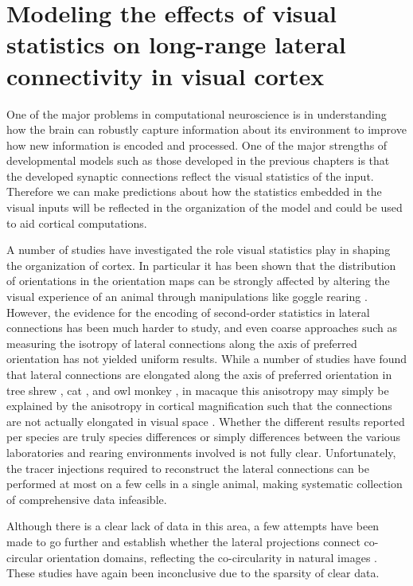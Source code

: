 \chapter{Modeling the effects of visual statistics on long-range lateral connectivity in visual cortex}

One of the major problems in computational neuroscience is in
understanding how the brain can robustly capture information about its
environment to improve how new information is encoded and
processed. One of the major strengths of developmental models such
as those developed in the previous chapters is that the developed
synaptic connections reflect the visual statistics of the
input. Therefore we can make predictions about how the statistics
embedded in the visual inputs will be reflected in the organization of the
model and could be used to aid cortical computations.

A number of studies have investigated the role visual statistics play
in shaping the organization of cortex. In particular it has been shown
that the distribution of orientations in the orientation maps can be
strongly affected by altering the visual experience of an animal
through manipulations like goggle rearing \citep{Tanaka2006}. However,
the evidence for the encoding of second-order statistics in lateral
connections has been much harder to study, and even coarse approaches
such as measuring the isotropy of lateral connections along the axis
of preferred orientation has not yielded uniform results. While a
number of studies have found that lateral connections are elongated
along the axis of preferred orientation in tree shrew
\citep{Bosking1997}, cat \citep{Schmidt1997}, and owl monkey
\citep{Sincich2001}, in macaque this anisotropy may simply be explained by
the anisotropy in cortical magnification such that the connections are
not actually elongated in visual space \citep{Angelucci2002}.  Whether
the different results reported per species are truly species
differences or simply differences between the various laboratories and
rearing environments involved is not fully clear. Unfortunately, the
tracer injections required to reconstruct the lateral connections can
be performed at most on a few cells in a single animal, making
systematic collection of comprehensive data infeasible.

Although there is a clear lack of data in this area, a few attempts
have been made to go further and establish whether the lateral
projections connect co-circular orientation domains, reflecting the
co-circularity in natural images \citep{Hunt2011}. These studies have
again been inconclusive due to the sparsity of clear data.

